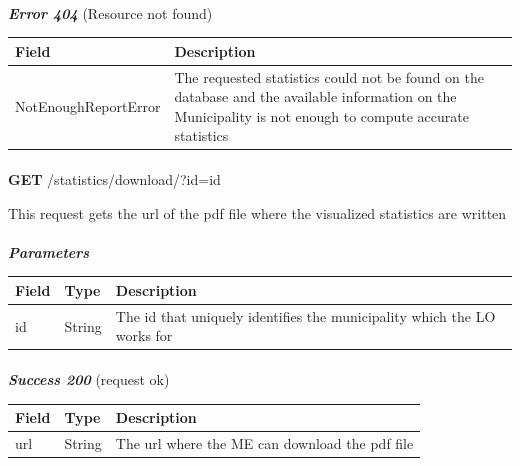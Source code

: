 						\paragraph{}
							\textit{\textbf{Error 404}} (Resource not found)
							\vspace{-2mm}
							\begin{table}[!h]
								\begin{tabular}{L{0.3\textwidth}L{0.5\textwidth}}
									\toprule
									\textbf{Field} & \textbf{Description} \\
									\midrule
								  	NotEnoughReportError & The requested statistics could not be found on the database and the available information on the Municipality is not enough to compute accurate statistics \\
								 	\bottomrule
								\end{tabular}
							\end{table}
						
						\paragraph{}
						\textbf{GET} /statistics/download/?id={id}
						
						This request gets the url of the pdf file where the visualized statistics are written
						\paragraph{}
							\textit{\textbf{Parameters}}
							\vspace{-2mm}
							\begin{table}[!h]
								\begin{tabular}{L{0.2\textwidth}L{0.2\textwidth}L{0.4\textwidth}}
									\toprule
									\textbf{Field} & \textbf{Type} & \textbf{Description} \\
									\midrule
								 	id & String & The id that uniquely identifies the municipality which the LO works for \\
								 	\bottomrule
								\end{tabular}
							\end{table}
						\paragraph{}
							\textit{\textbf{Success 200}} (request ok)
							\vspace{-2mm}
							\begin{table}[!h]
								\begin{tabular}{L{0.25\textwidth}L{0.1\textwidth}L{0.45\textwidth}}
									\toprule
									\textbf{Field} & \textbf{Type} & \textbf{Description} \\
									\midrule
									url & String & The url where the ME can download the pdf file \\
								 	\bottomrule
								\end{tabular}
							\end{table}
						\clearpage
